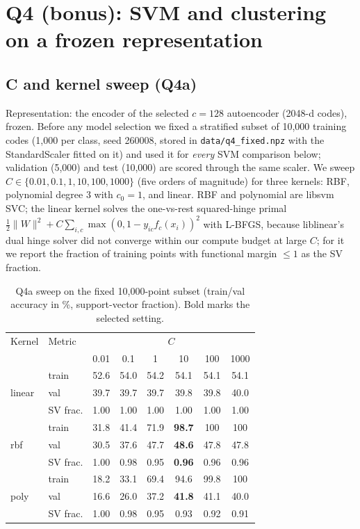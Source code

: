 \documentclass[10pt,twocolumn,letterpaper]{article}
\begin{document}
\section{Q4 (bonus): SVM and clustering on a frozen representation}
\subsection{C and kernel sweep (Q4a)}
Representation: the encoder of the selected $c{=}128$ autoencoder (2048-d codes), frozen.
Before any model selection we fixed a stratified subset of 10{,}000 training codes (1{,}000 per class, seed 260008, stored in \texttt{data/q4\_fixed.npz} with the StandardScaler fitted on it) and used it for \emph{every} SVM comparison below; validation (5{,}000) and test (10{,}000) are scored through the same scaler.
We sweep $C \in \{0.01, 0.1, 1, 10, 100, 1000\}$ (five orders of magnitude) for three kernels: RBF, polynomial degree 3 with $c_0{=}1$, and linear.
RBF and polynomial are libsvm SVC; the linear kernel solves the one-vs-rest squared-hinge primal $\tfrac12\|W\|^2 + C\sum_{i,c}\max(0,1-y_{ic}f_c(x_i))^2$ with L-BFGS, because liblinear's dual hinge solver did not converge within our compute budget at large $C$; for it we report the fraction of training points with functional margin $\le 1$ as the SV fraction.

\begin{table}[t]
\centering\small
\setlength{\tabcolsep}{3.6pt}
\begin{tabular}{llcccccc}
\toprule
Kernel & Metric & \multicolumn{6}{c}{$C$} \\
 & & 0.01 & 0.1 & 1 & 10 & 100 & 1000 \\
\midrule
\multirow{3}{*}{linear}
 & train & 52.6 & 54.0 & 54.2 & 54.1 & 54.1 & 54.1 \\
 & val & 39.7 & 39.7 & 39.7 & 39.8 & 39.8 & 40.0 \\
 & SV frac. & 1.00 & 1.00 & 1.00 & 1.00 & 1.00 & 1.00 \\
\midrule
\multirow{3}{*}{rbf}
 & train & 31.8 & 41.4 & 71.9 & \textbf{98.7} & 100 & 100 \\
 & val & 30.5 & 37.6 & 47.7 & \textbf{48.6} & 47.8 & 47.8 \\
 & SV frac. & 1.00 & 0.98 & 0.95 & \textbf{0.96} & 0.96 & 0.96 \\
\midrule
\multirow{3}{*}{poly}
 & train & 18.2 & 33.1 & 69.4 & 94.6 & 99.8 & 100 \\
 & val & 16.6 & 26.0 & 37.2 & \textbf{41.8} & 41.1 & 40.0 \\
 & SV frac. & 1.00 & 0.98 & 0.95 & 0.93 & 0.92 & 0.91 \\
\bottomrule
\end{tabular}
\caption{Q4a sweep on the fixed 10{,}000-point subset (train/val accuracy in \%, support-vector fraction). Bold marks the selected setting.}
\label{tab:q4a}
\end{table}
\end{document}
